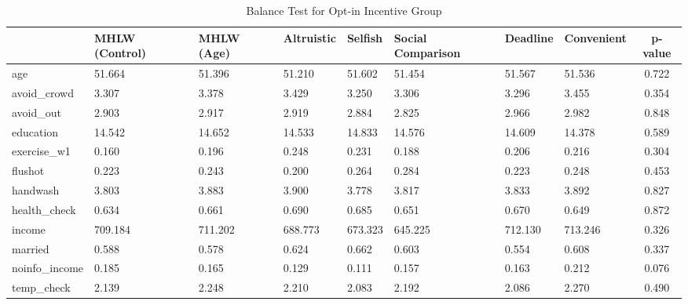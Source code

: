 \begin{table}[!h]

\caption{Balance Test for Opt-in Incentive Group \label{tab:act2-coupon0-balance}}
\centering
\fontsize{9}{11}\selectfont
\begin{threeparttable}
\begin{tabular}[t]{l>{\centering\arraybackslash}p{3em}>{\centering\arraybackslash}p{3em}>{\centering\arraybackslash}p{3em}>{\centering\arraybackslash}p{3em}>{\centering\arraybackslash}p{3em}>{\centering\arraybackslash}p{3em}>{\centering\arraybackslash}p{3em}c}
\toprule
  & MHLW (Control) & MHLW (Age) & Altruistic & Selfish & Social Comparison & Deadline & Convenient & p-value\\
\midrule
age & \num{51.664} & \num{51.396} & \num{51.210} & \num{51.602} & \num{51.454} & \num{51.567} & \num{51.536} & \num{0.722}\\
avoid\_crowd & \num{3.307} & \num{3.378} & \num{3.429} & \num{3.250} & \num{3.306} & \num{3.296} & \num{3.455} & \num{0.354}\\
avoid\_out & \num{2.903} & \num{2.917} & \num{2.919} & \num{2.884} & \num{2.825} & \num{2.966} & \num{2.982} & \num{0.848}\\
education & \num{14.542} & \num{14.652} & \num{14.533} & \num{14.833} & \num{14.576} & \num{14.609} & \num{14.378} & \num{0.589}\\
exercise\_w1 & \num{0.160} & \num{0.196} & \num{0.248} & \num{0.231} & \num{0.188} & \num{0.206} & \num{0.216} & \num{0.304}\\
flushot & \num{0.223} & \num{0.243} & \num{0.200} & \num{0.264} & \num{0.284} & \num{0.223} & \num{0.248} & \num{0.453}\\
handwash & \num{3.803} & \num{3.883} & \num{3.900} & \num{3.778} & \num{3.817} & \num{3.833} & \num{3.892} & \num{0.827}\\
health\_check & \num{0.634} & \num{0.661} & \num{0.690} & \num{0.685} & \num{0.651} & \num{0.670} & \num{0.649} & \num{0.872}\\
income & \num{709.184} & \num{711.202} & \num{688.773} & \num{673.323} & \num{645.225} & \num{712.130} & \num{713.246} & \num{0.326}\\
married & \num{0.588} & \num{0.578} & \num{0.624} & \num{0.662} & \num{0.603} & \num{0.554} & \num{0.608} & \num{0.337}\\
noinfo\_income & \num{0.185} & \num{0.165} & \num{0.129} & \num{0.111} & \num{0.157} & \num{0.163} & \num{0.212} & \num{0.076}\\
temp\_check & \num{2.139} & \num{2.248} & \num{2.210} & \num{2.083} & \num{2.192} & \num{2.086} & \num{2.270} & \num{0.490}\\

\end{tabular}
\end{threeparttable}
\end{table}
